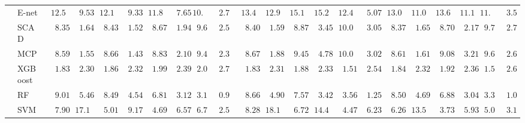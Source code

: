 \begin{tabular}{ll|ll|llllll|llllll|llllll}
 & E-net  & $\phantom{0}12.56$ & $\phantom{00}9.53$ & $\phantom{0}12.11$ & $\phantom{00}9.33$ & $\phantom{0}11.89$ & $\phantom{00}7.65$ & $10.61$ & $\phantom{0}2.72$ & $\phantom{0}13.40$ & $\phantom{0}12.95$ & $\phantom{0}15.16$ & $\phantom{0}15.27$ & $\phantom{0}12.46$ & $\phantom{00}5.07$ & $\phantom{0}13.07$ & $\phantom{0}11.09$ & $\phantom{0}13.68$ & $\phantom{0}11.16$ & $11.00$ & $\phantom{0}3.52$ \\
 & SCAD  & $\phantom{00}8.35$ & $\phantom{00}1.64$ & $\phantom{00}8.43$ & $\phantom{00}1.52$ & $\phantom{00}8.67$ & $\phantom{00}1.94$ & $\phantom{0}9.67$ & $\phantom{0}2.56$ & $\phantom{00}8.40$ & $\phantom{00}1.59$ & $\phantom{00}8.87$ & $\phantom{00}3.45$ & $\phantom{0}10.02$ & $\phantom{00}3.05$ & $\phantom{00}8.37$ & $\phantom{00}1.65$ & $\phantom{00}8.70$ & $\phantom{00}2.17$ & $\phantom{0}9.77$ & $\phantom{0}2.72$ \\
 & MCP  & $\phantom{00}8.59$ & $\phantom{00}1.55$ & $\phantom{00}8.66$ & $\phantom{00}1.43$ & $\phantom{00}8.83$ & $\phantom{00}2.10$ & $\phantom{0}9.47$ & $\phantom{0}2.31$ & $\phantom{00}8.67$ & $\phantom{00}1.88$ & $\phantom{00}9.45$ & $\phantom{00}4.78$ & $\phantom{0}10.02$ & $\phantom{00}3.02$ & $\phantom{00}8.61$ & $\phantom{00}1.61$ & $\phantom{00}9.08$ & $\phantom{00}3.21$ & $\phantom{0}9.65$ & $\phantom{0}2.61$ \\
 & XGBoost  & $\phantom{00}1.83$ & $\phantom{00}2.30$ & $\phantom{00}1.86$ & $\phantom{00}2.32$ & $\phantom{00}1.99$ & $\phantom{00}2.39$ & $\phantom{0}2.04$ & $\phantom{0}2.73$ & $\phantom{00}1.83$ & $\phantom{00}2.31$ & $\phantom{00}1.88$ & $\phantom{00}2.33$ & $\phantom{00}1.51$ & $\phantom{00}2.54$ & $\phantom{00}1.84$ & $\phantom{00}2.32$ & $\phantom{00}1.92$ & $\phantom{00}2.36$ & $\phantom{0}1.56$ & $\phantom{0}2.60$ \\
 & RF  & $\phantom{00}9.01$ & $\phantom{00}5.46$ & $\phantom{00}8.49$ & $\phantom{00}4.54$ & $\phantom{00}6.81$ & $\phantom{00}3.12$ & $\phantom{0}3.18$ & $\phantom{0}0.96$ & $\phantom{00}8.66$ & $\phantom{00}4.90$ & $\phantom{00}7.57$ & $\phantom{00}3.42$ & $\phantom{00}3.56$ & $\phantom{00}1.25$ & $\phantom{00}8.50$ & $\phantom{00}4.69$ & $\phantom{00}6.88$ & $\phantom{00}3.04$ & $\phantom{0}3.38$ & $\phantom{0}1.07$ \\
 & SVM  & $\phantom{00}7.90$ & $\phantom{0}17.17$ & $\phantom{00}5.01$ & $\phantom{00}9.17$ & $\phantom{00}4.69$ & $\phantom{00}6.57$ & $\phantom{0}6.76$ & $\phantom{0}2.56$ & $\phantom{00}8.28$ & $\phantom{0}18.17$ & $\phantom{00}6.72$ & $\phantom{0}14.47$ & $\phantom{00}4.47$ & $\phantom{00}6.23$ & $\phantom{00}6.26$ & $\phantom{0}13.53$ & $\phantom{00}3.73$ & $\phantom{00}5.93$ & $\phantom{0}5.00$ & $\phantom{0}3.11$ \\\hline

\end{tabular}
